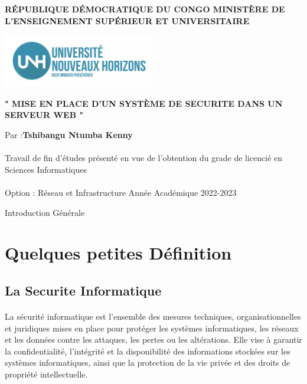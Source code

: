 \documentclass{report}
\begin{document}
	\author{Tshibangu Ntumba Kenny}
	
	\begin{titlepage}
		
		\centering
		
		\textbf{\Large RÉPUBLIQUE DÉMOCRATIQUE DU CONGO
			MINISTÈRE DE L’ENSEIGNEMENT SUPÉRIEUR ET UNIVERSITAIRE}
		\vspace{1.5cm}
		 
		 \includegraphics[width=0.5\textwidth]{Logo.jpg}
		 \vspace{3.5cm}
		 
		 
		 \textbf{\Large "  MISE EN PLACE D'UN SYSTÈME DE SECURITE DANS UN SERVEUR WEB "}
		 \vspace{2.5cm}
		 
		  \large Par :\textbf{Tshibangu Ntumba Kenny} 
		  
		  \paragraph{ } Travail de fin d’études présenté en vue de l’obtention
		  du grade de licencié en Sciences Informatiques
		\paragraph{ } \Large{ Option : Réseau et Infrastructure}
		 \vfill
		 {\LARGE Année Académique 2022-2023}
	\end{titlepage}
\begin{center}
\tableofcontents
\pagebreak
\end{center}
	    
	\begin{Huge}
	Introduction Générale
	\end{Huge}
	 
 \section{ Quelques petites Définition}
 \subsection{La Securite Informatique }
 
 \paragraph{ }  La sécurité informatique est l'ensemble des mesures techniques, organisationnelles et juridiques mises en place pour protéger les systèmes informatiques, les réseaux et les données contre les attaques, les pertes ou les altérations. Elle vise à garantir la confidentialité, l'intégrité et la disponibilité des informations stockées sur les systèmes informatiques, ainsi que la protection de la vie privée et des droits de propriété intellectuelle.  
 
\end{document}
